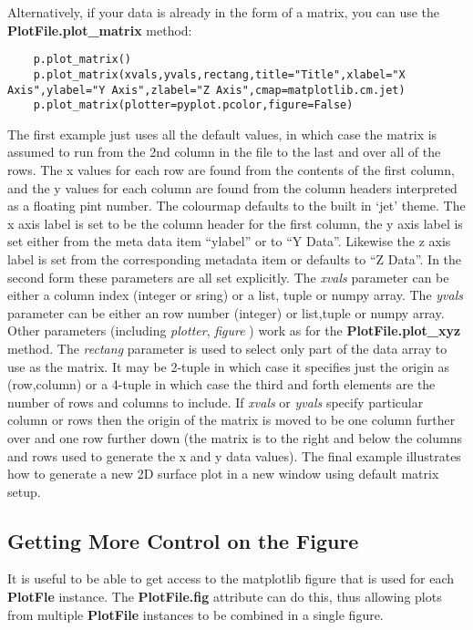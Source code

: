 \documentclass[a4paper,11pt]{scrartcl}
\begin{document}
 Alternatively, if your data is already in the form of a matrix, you can use the \textbf{PlotFile.plot\_matrix} method:

 \begin{lstlisting}
    p.plot_matrix()
    p.plot_matrix(xvals,yvals,rectang,title="Title",xlabel="X Axis",ylabel="Y Axis",zlabel="Z Axis",cmap=matplotlib.cm.jet)
    p.plot_matrix(plotter=pyplot.pcolor,figure=False)
 \end{lstlisting}

 The first example just uses all the default values, in which case the matrix is assumed to run from the 2nd column in the file to the last and over all of the rows. The x values for each row are found from the contents of the first column, and the y values for each column are found from the column headers interpreted as a floating pint number. The colourmap defaults to the built in `jet' theme. The x axis label is set to be the column header for the first column, the y axis label is set either from the meta data item ``ylabel'' or to ``Y Data''. Likewise the z axis label is set from the corresponding metadata item or defaults to ``Z Data''. In the second form these parameters are all set explicitly. The \textit{xvals} parameter can be either a column index (integer or sring) or a list, tuple or numpy array. The \textit{yvals} parameter can be either an row number (integer) or list,tuple or numpy array. Other parameters (including \textit{plotter}, \textit{figure} \etc) work as for the \textbf{PlotFile.plot\_xyz} method. The \textit{rectang} parameter is used to select only part of the data array to use as the matrix. It may be 2-tuple in which case it specifies just the origin as (row,column) or a 4-tuple in which case the third and forth elements are the number of rows and columns to include. If \textit{xvals} or \textit{yvals} specify particular column or rows then the origin of the matrix is moved to be one column further over and one row further down (\ie the matrix is to the right and below the columns and rows used to generate the x and y data values). The final example illustrates how to generate a new 2D surface plot in a new window using default matrix setup.

 \subsection{Getting More Control on the Figure}

 It is useful to be able to get access to the matplotlib figure that is used for each \textbf{PlotFle} instance. The \textbf{PlotFile.fig} attribute can do this, thus allowing plots from multiple \textbf{PlotFile} instances to be combined in a single figure.
\end{document}
